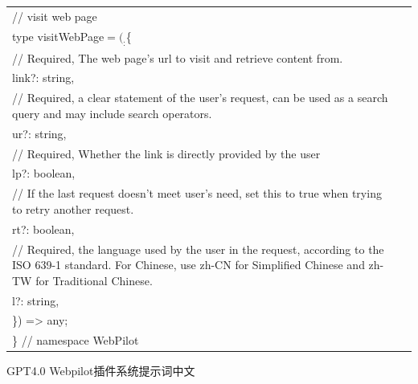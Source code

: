 \documentclass[12pt]{book}
\begin{document}
{\begin{tabular}{|p{15cm}|p{3cm}|}
	// visit web page\\
	type visitWebPage$= (_:$\{\\
		// Required, The web page's url to visit and retrieve content from.\\
		link?: string,\\
		// Required, a clear statement of the user's request, can be used as a search query and may include search operators.\\
		ur?: string,\\
		// Required, Whether the link is directly provided by the user\\
		lp?: boolean,\\
		// If the last request doesn't meet user's need, set this to true when trying to retry another request.\\
		rt?: boolean,\\
		// Required, the language used by the user in the request, according to the ISO 639-1 standard. For Chinese, use zh-CN for Simplified Chinese and zh-TW for Traditional Chinese.\\
		l?: string,\\
	\}) => any;\\
	
\} // namespace WebPilot\\
	\hline
\end{tabular}
}


\bigskip
GPT4.0 Webpilot插件系统提示词中文
\end{document}
